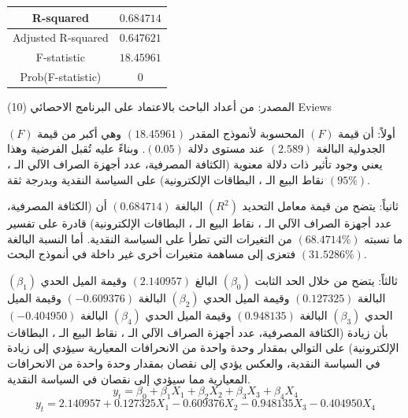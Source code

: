 \documentclass[10pt,a4paper]{report}
\begin{document}
\begin{doublespacing}
\begin{table}[H]
{\begin{tabular}{|c|c|c|c|c|}
	\textenglish{R-squared}                  & \multicolumn{4}{c|}{$0.684714$}                                                                                             \\ \hline
	\textenglish{Adjusted R-squared}         & \multicolumn{4}{c|}{$0.647621$}                                                                                             \\ \hline
	\textenglish{F-statistic}                & \multicolumn{4}{c|}{$18.45961$}                                                                                             \\ \hline
	\textenglish{Prob(F-statistic)}          & \multicolumn{4}{c|}{$0$}                                                                                                    \\ \hline
\end{tabular}
		}
	\end{table}
	
المصدر: من أعداد الباحث بالاعتماد على البرنامج الاحصائي (10) Eviews

\noindent أولاً: أن قيمة $(F)$ المحسوبة لأنموذج المقدر $(18.45961)$ وهي أكبر من قيمة $(F)$ الجدولية البالغة $(2.589)$ عند مستوى دلالة $(0.05)$. وبناءً عليه تُقبل الفرضية وهذا يعني وجود تأثير ذات دلالة معنوية ({الكثافة المصرفية، عدد أجهزة الصراف الآلي الـ ، نقاط البيع الـ ، البطاقات الإلكترونية}) على السياسة النقدية وبدرجة ثقة $(95\%)$.

\vspace{0.3cm}

\noindent ثانياً: يتضح من قيمة معامل التحديد $(R^2)$ البالغة $(0.684714)$ أن ({الكثافة المصرفية، عدد أجهزة الصراف الآلي الـ ، نقاط البيع الـ ، البطاقات الإلكترونية}) قادرة على تفسير ما نسبته $(68.4714\%)$ من التغيرات التي تطرأ على السياسة النقدية. أما النسبة البالغة $(31.5286\%)$ فتعزى إلى مساهمة متغيرات أخرى غير داخلة في أنموذج البحث.

\vspace{0.3cm}

\noindent ثالثاً: يتضح من خلال الحد الثابت $(\beta_0)$ البالغ $(2.140957)$ وقيمة الميل الحدي $(\beta_1)$ البالغة $(0.127325)$ وقيمة الميل الحدي $(\beta_2)$ البالغة $(-0.609376)$ وقيمة الميل الحدي $(\beta_3)$ البالغة $(0.948135)$ وقيمة الميل الحدي $(\beta_4)$ البالغة $(-0.404950)$ بأن زيادة ({الكثافة المصرفية، عدد أجهزة الصراف الآلي الـ ، نقاط البيع الـ ، البطاقات الإلكترونية}) على التوالي بمقدار وحدة واحدة من الانحرافات المعيارية سيؤدي إلى زيادة في السياسة النقدية، والعكس يؤدي إلى نقصان بمقدار وحدة واحدة من الانحرافات المعيارية مما سيؤدي إلى نقصان في السياسة النقدية.
\begin{equation}
	y_t=\beta_0+\beta_1X_1+\beta_2X_2+\beta_3X_3+\beta_4X_4
\end{equation}
\[
y_t = 2.140957 + 0.127325X_1 - 0.609376X_2 - 0.948135X_3 - 0.404950X_4
\]


\end{doublespacing}
\end{document}
